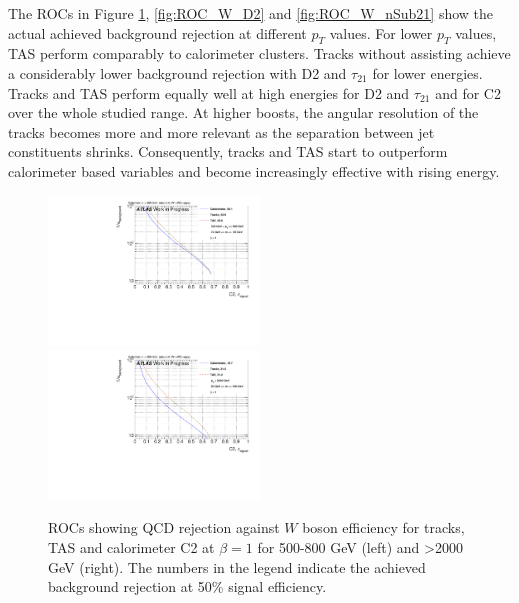 The ROCs in Figure \ref{fig:ROC_W_C2}, \ref{fig:ROC_W_D2} and \ref{fig:ROC_W_nSub21} show the actual achieved background rejection at different $p_T$ values. For lower $p_T$ values, TAS perform comparably to calorimeter clusters. Tracks without assisting achieve a considerably lower background rejection with D2 and $\tau_{21}$ for lower energies. Tracks and TAS perform equally well at high energies for D2 and $\tau_{21}$ and for C2 over the whole studied range. At higher boosts, the angular resolution of the tracks becomes more and more relevant as the separation between jet constituents shrinks. Consequently, tracks and TAS start to outperform calorimeter based variables and become increasingly effective with rising energy. 
\begin{figure}[htp]
\includegraphics[width=0.5\textwidth]{sascha_input/plots/W/beta1/ROC_ALL_h_recoJet_C2_bin2.pdf} \hspace{1mm}
\includegraphics[width=0.5\textwidth]{sascha_input/plots/W/beta1/ROC_ALL_h_recoJet_C2_bin6.pdf}
\caption{{ROCs showing QCD rejection against $W$ boson efficiency for tracks, TAS and calorimeter C2 at $\beta=1$ for 500-800 GeV (left) and >2000 GeV (right). The numbers in the legend indicate the achieved background rejection at 50\% signal efficiency.}}\label{fig:ROC_W_C2}
\end{figure}

